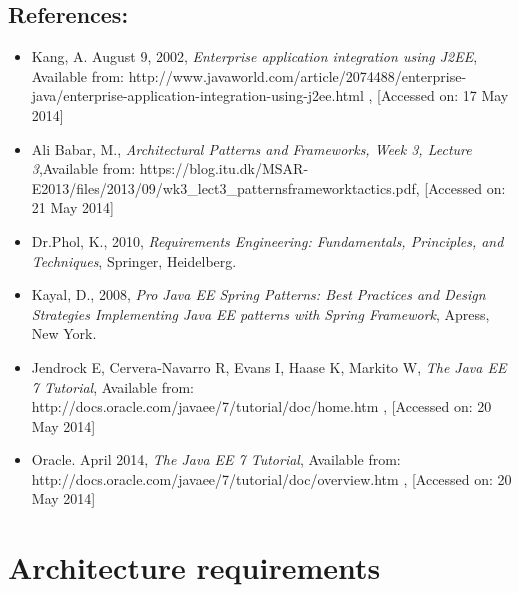 \documentclass[12pt]{article}
\begin{document}
\vspace{0.2in}

\subsection{References:}
\vspace{0.1in}
\begin{itemize}
\item Kang, A. August 9, 2002, \textit{Enterprise application integration using J2EE}, Available from: http://www.javaworld.com/article/2074488/enterprise-java/enterprise-application-integration-using-j2ee.html , [Accessed on: 17 May 2014]
\item Ali Babar, M., \textit{Architectural Patterns and Frameworks, Week 3, Lecture 3},Available from: https://blog.itu.dk/MSAR-E2013/files/2013/09/wk3\_lect3\_patternsframeworktactics.pdf, [Accessed on: 21 May 2014]
\item Dr.Phol, K., 2010, \textit{Requirements Engineering: Fundamentals, Principles, and Techniques}, Springer, Heidelberg.
\item Kayal, D., 2008, \textit{Pro Java EE Spring Patterns: Best Practices and Design Strategies Implementing Java EE patterns with Spring Framework}, Apress, New York.
\item Jendrock E, Cervera-Navarro R, Evans I, Haase K, Markito W, \textit{The Java EE 7 Tutorial}, Available from: http://docs.oracle.com/javaee/7/tutorial/doc/home.htm , [Accessed on: 20 May 2014]
\item Oracle. April 2014, \textit{The Java EE 7 Tutorial}, Available from: http://docs.oracle.com/javaee/7/tutorial/doc/overview.htm , [Accessed on: 20 May 2014]
\end{itemize}	

\vspace{0.5in}

\newpage
\section{Architecture requirements}
\end{document}
